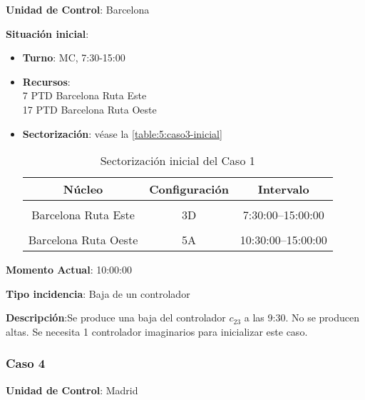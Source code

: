 \textbf{Unidad de Control}: Barcelona

\textbf{Situación inicial}:
\begin{itemize}[label={}]
	
	\item \textbf{Turno}: MC, 7:30-15:00
	
	\item \textbf{Recursos}: \\
	7 PTD Barcelona Ruta Este \\
	17 PTD Barcelona Ruta Oeste
	
	
	\item \textbf{Sectorización}: véase la \autoref{table:5:caso3-inicial}
	\begin{table}[h]
		\centering
		\caption{Sectorización inicial del Caso 1}
		\begin{tabular}{ccc}
			\hline
			\textbf{Núcleo}      & \textbf{Configuración} & \textbf{Intervalo}   \\ \hline
			\multicolumn{1}{l}{} & \multicolumn{1}{l}{}   & \multicolumn{1}{l}{} \\
			Barcelona Ruta Este  & 3D                     & 7:30:00--15:00:00    \\
			\multicolumn{1}{l}{} & \multicolumn{1}{l}{}   & \multicolumn{1}{l}{} \\
			Barcelona Ruta Oeste & 5A                     & 10:30:00--15:00:00   \\ \hline
		\end{tabular}
		\label{table:5:caso3-inicial}
	\end{table}
	
	
\end{itemize}

\textbf{Momento Actual}: 10:00:00

\textbf{Tipo incidencia}: Baja de un controlador

\textbf{Descripción}:Se produce una baja del controlador $c_{23}$ a las 9:30. No se producen altas. Se necesita 1 controlador imaginarios para inicializar este caso.

\subsubsection{Caso 4}

\textbf{Unidad de Control}: Madrid

